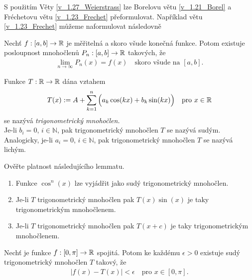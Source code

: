 S použitím Věty \ref{v_1.27_Weierstrass} lze Borelovu větu \ref{v_1.21_Borel} a Fréchetovu větu \ref{v_1.23_Frechet} přeformulovat. Například větu \ref{v_1.23_Frechet} můžeme naformulovat následovně

\begin{theorem}
Nechť $f:[a,b] \to \mathbb{R}$ je měřitelná a skoro všude konečná funkce. Potom existuje posloupnost mnohočlen\r u $P_n:[a,b] \to \mathbb{R}$ takových, že 
\begin{align*}
\lim \limits _{n \to \infty} P_n(x)=f(x) \quad \text{skoro všude na $[a,b]$.}
\end{align*}
\end{theorem}

\begin{definition}
\label{d_1.29_Trigonometricky_Mnohoclen}
Funkce $T:\mathbb{R} \to \mathbb{R}$ dána vztahem 
\begin{align*}
T(x):=A+ \sum \limits _{k=1}^{n} \Big(a_k \cos(kx)+b_k \sin (kx) \Big) \quad \text{pro $x \in \mathbb{R}$}
\end{align*}
se nazývá \textit{trigonometrický mnohočlen.} \\
Je-li $b_i=0$, $i \in \mathbb{N}$, pak trigonometrický mnohočlen $T$ se nazývá sudým. \\
Analogicky, je-li $a_i=0$, $i \in \mathbb{N}$, pak trigonometrický mnohočlen $T$ se nazývá lichým. 
\end{definition}



\begin{uloha}
Ověřte platnost následujícího lemmatu.
\end{uloha}

\begin{lemma}
\label{l_1.31}
\begin{enumerate}
\item Funkce $\cos^n(x)$ lze vyjádřit jako sudý trigonometrický mnohočlen.
\item Je-li $T$ trigonometrický mnohočlen pak $T(x)\sin(x)$ je taky trigonometrickým mnohočlenem.
\item Je-li $T$ trigonometrický mnohočlen pak $T(x+c)$ je taky trigonometrickým mnohočlenem.
\end{enumerate}
\end{lemma}

\begin{theorem}
Nechť je funkce $f:[0,\pi] \to \mathbb{R}$ spojitá. Potom ke každému $\epsilon >0$ existuje sudý trigonometrický mnohočlen $T$ takový, že 
\begin{align*}
|f(x)-T(x)|< \epsilon \quad \text{pro $x \in [0,\pi]$.}
\end{align*}
\end{theorem}

